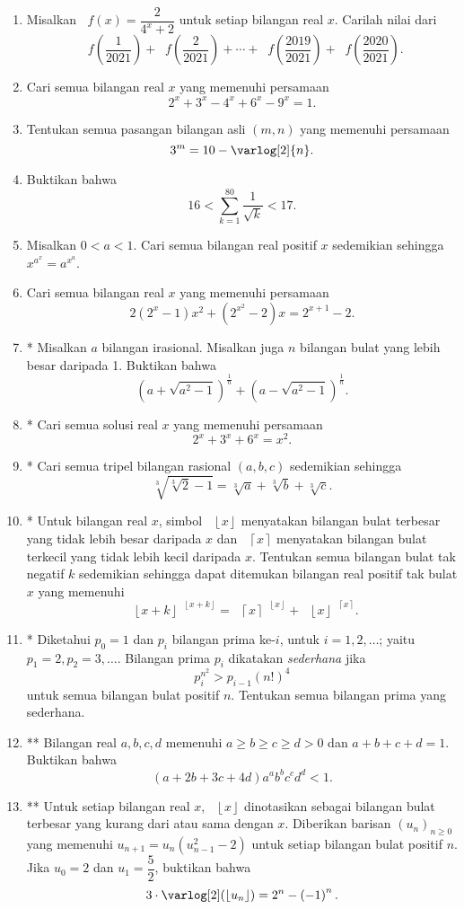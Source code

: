 \documentclass[12pt]{article}
\newcommand*\floor[1]{\mathop{}\!\left\lfloor{#1}\right\rfloor}
\newcommand*\ceil[1]{\mathop{}\!\left\lceil{#1}\right\rceil}
\newcommand*\func[2]{\mathop{}\!{#1}{\left({#2}\right)}}
\let\log\varlog
\begin{document}
\begin{enumerate}[leftmargin=*]
		\item Misalkan $ \func{f}{x} = \dfrac{2}{4^{x} + 2} $ untuk setiap bilangan real $ x $. Carilah nilai dari
		\[ \func{f}{\frac{1}{2021}} + \func{f}{\frac{2}{2021}} + \cdots + \func{f}{\frac{2019}{2021}} + \func{f}{\frac{2020}{2021}}. \]
		\item Cari semua bilangan real $ x $ yang memenuhi persamaan
		\[ 2^{x} + 3^{x} - 4^{x} + 6^{x} - 9^{x} = 1. \]
		\item Tentukan semua pasangan bilangan asli $ \left(m, n\right) $ yang memenuhi persamaan
		\[ 3^{m} = 10 - \log[2]{n}. \]
		\item Buktikan bahwa
		\[ 16 < \sum_{k = 1}^{80}{\frac{1}{\sqrt{k}}} < 17. \]
		\item Misalkan $ 0 < a < 1 $. Cari semua bilangan real positif $ x $ sedemikian sehingga $ x^{a^{x}} = a^{x^{a}} $.
		\item Cari semua bilangan real $ x $ yang memenuhi persamaan
		\[ 2\left(2^{x} - 1\right)x^{2} + \left(2^{x^{2}} - 2\right)x = 2^{x + 1} - 2. \]
		\item* Misalkan $ a $ bilangan irasional. Misalkan juga $ n $ bilangan bulat yang lebih besar daripada 1. Buktikan bahwa
		\[ \left(a + \sqrt{a^{2} - 1}\right)^{\frac{1}{n}} + \left(a - \sqrt{a^{2} - 1}\right)^{\frac{1}{n}}. \]
		\item* Cari semua solusi real $ x $ yang memenuhi persamaan
		\[ 2^{x} + 3^{x} + 6^{x} = x^{2}. \]
		\item* Cari semua tripel bilangan rasional $ \left(a, b, c\right) $ sedemikian sehingga
		\[ \sqrt[3]{\sqrt[3]{2} - 1} = \sqrt[3]{a} + \sqrt[3]{b} + \sqrt[3]{c}. \]
		\item* Untuk bilangan real $ x $, simbol $ \floor{x} $ menyatakan bilangan bulat terbesar yang tidak lebih besar daripada $ x $ dan $ \ceil{x} $ menyatakan bilangan bulat terkecil yang tidak lebih kecil daripada $ x $. Tentukan semua bilangan bulat tak negatif $ k $ sedemikian sehingga dapat ditemukan bilangan real positif tak bulat $ x $ yang memenuhi
		\[ \floor{x + k}^{\floor{x + k}} = \ceil{x}^{\floor{x}} + \floor{x}^{\ceil{x}}. \]
		\item* Diketahui $ p_{0} = 1 $ dan $ p_{i} $ bilangan prima ke-$ i $, untuk $ i = 1, 2, \dots $; yaitu $ p_{1} = 2, p_{2} = 3, \dots $. Bilangan prima $ p_{i} $ dikatakan \textit{sederhana} jika
		\[ p_{i}^{n^{2}} > p_{i - 1}\left(n!\right)^{4} \]
		untuk semua bilangan bulat positif $ n $. Tentukan semua bilangan prima yang sederhana.
		\item** Bilangan real $ a, b, c, d $ memenuhi $ a \geq b \geq c \geq d > 0 $ dan $ a + b + c + d = 1 $. Buktikan bahwa
		\[ \left(a + 2b + 3c + 4d\right)a^{a}b^{b}c^{c}d^{d} < 1. \]
		\item** Untuk setiap bilangan real $ x $, $ \floor{x} $ dinotasikan sebagai bilangan bulat terbesar yang kurang dari atau sama dengan $ x $. Diberikan barisan $ \left(u_{n}\right)_{n \geq 0} $ yang memenuhi $ u_{n + 1} = u_{n}\left(u_{n - 1}^{2} - 2\right) $ untuk setiap bilangan bulat positif $ n $. Jika $ u_{0} = 2 $ dan $ u_{1} = \dfrac{5}{2} $, buktikan bahwa
		\[ 3 \cdot \func{\log[2]}{\floor{u_{n}}} = 2^{n} - \left(-1\right)^{n}. \]
	\end{enumerate}
\end{document}
